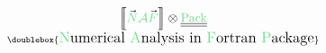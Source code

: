 \documentclass{standalone}
\begin{document}
\Huge

$
\underset{\text{\doublebox{\text{\large \textcolor{ultramarine}{N}umerical \textcolor{ultramarine}{A}nalysis in \textcolor{ultramarine}{F}ortran \textcolor{ultramarine}{P}ackage}}}}{
\left\llbracket \vec{\textcolor{ultramarine}{N}} \mathcal{\textcolor{ultramarine}{A}} \vec{\textcolor{ultramarine}{F}}\right\rrbracket \otimes \underline{\underline{\mathrm{\textcolor{ultramarine}{Pack}}}}%
}
$
\end{document}
